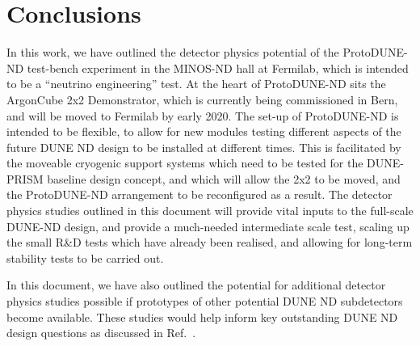 \section{Conclusions}
\label{sec:conclusions}

In this work, we have outlined the detector physics potential of the ProtoDUNE-ND test-bench experiment in the MINOS-ND hall at Fermilab, which is intended to be a ``neutrino engineering'' test. At the heart of ProtoDUNE-ND sits the ArgonCube 2x2 Demonstrator, which is currently being commissioned in Bern, and will be moved to Fermilab by early 2020. The set-up of ProtoDUNE-ND is intended to be flexible, to allow for new modules testing different aspects of the future DUNE ND design to be installed at different times. This is facilitated by the moveable cryogenic support systems which need to be tested for the DUNE-PRISM baseline design concept, and which will allow the 2x2 to be moved, and the ProtoDUNE-ND arrangement to be reconfigured as a result. The detector physics studies outlined in this document will provide vital inputs to the full-scale DUNE-ND design, and provide a much-needed intermediate scale test, scaling up the small R\&D tests which have already been realised, and allowing for long-term stability tests to be carried out.

In this document, we have also outlined the potential for additional detector physics studies possible if prototypes of other potential DUNE ND subdetectors become available. These studies would help inform key outstanding DUNE ND design questions as discussed in Ref.~\cite{dune_ndcsg}. 
